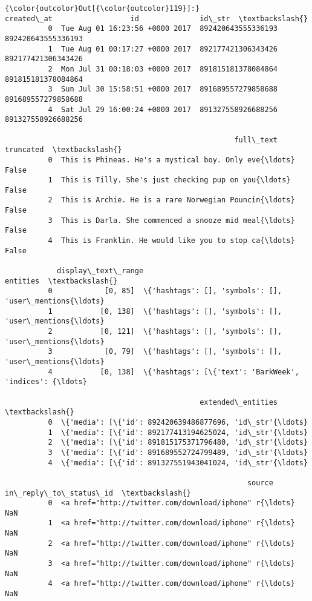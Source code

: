 \documentclass[11pt]{article}
\begin{document}
\begin{Verbatim}[commandchars=\\\{\}]
{\color{outcolor}Out[{\color{outcolor}119}]:}                        created\_at                  id              id\_str  \textbackslash{}
          0  Tue Aug 01 16:23:56 +0000 2017  892420643555336193  892420643555336193   
          1  Tue Aug 01 00:17:27 +0000 2017  892177421306343426  892177421306343426   
          2  Mon Jul 31 00:18:03 +0000 2017  891815181378084864  891815181378084864   
          3  Sun Jul 30 15:58:51 +0000 2017  891689557279858688  891689557279858688   
          4  Sat Jul 29 16:00:24 +0000 2017  891327558926688256  891327558926688256   
          
                                                     full\_text  truncated  \textbackslash{}
          0  This is Phineas. He's a mystical boy. Only eve{\ldots}      False   
          1  This is Tilly. She's just checking pup on you{\ldots}      False   
          2  This is Archie. He is a rare Norwegian Pouncin{\ldots}      False   
          3  This is Darla. She commenced a snooze mid meal{\ldots}      False   
          4  This is Franklin. He would like you to stop ca{\ldots}      False   
          
            display\_text\_range                                           entities  \textbackslash{}
          0            [0, 85]  \{'hashtags': [], 'symbols': [], 'user\_mentions{\ldots}   
          1           [0, 138]  \{'hashtags': [], 'symbols': [], 'user\_mentions{\ldots}   
          2           [0, 121]  \{'hashtags': [], 'symbols': [], 'user\_mentions{\ldots}   
          3            [0, 79]  \{'hashtags': [], 'symbols': [], 'user\_mentions{\ldots}   
          4           [0, 138]  \{'hashtags': [\{'text': 'BarkWeek', 'indices': {\ldots}   
          
                                             extended\_entities  \textbackslash{}
          0  \{'media': [\{'id': 892420639486877696, 'id\_str'{\ldots}   
          1  \{'media': [\{'id': 892177413194625024, 'id\_str'{\ldots}   
          2  \{'media': [\{'id': 891815175371796480, 'id\_str'{\ldots}   
          3  \{'media': [\{'id': 891689552724799489, 'id\_str'{\ldots}   
          4  \{'media': [\{'id': 891327551943041024, 'id\_str'{\ldots}   
          
                                                        source  in\_reply\_to\_status\_id  \textbackslash{}
          0  <a href="http://twitter.com/download/iphone" r{\ldots}                    NaN   
          1  <a href="http://twitter.com/download/iphone" r{\ldots}                    NaN   
          2  <a href="http://twitter.com/download/iphone" r{\ldots}                    NaN   
          3  <a href="http://twitter.com/download/iphone" r{\ldots}                    NaN   
          4  <a href="http://twitter.com/download/iphone" r{\ldots}                    NaN   
          

\end{Verbatim}
\end{document}
